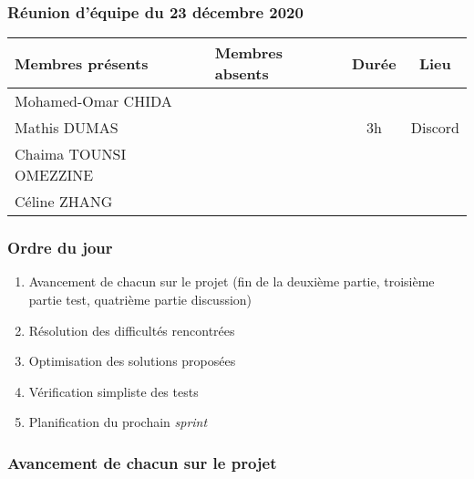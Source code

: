 


% 
\subsubsection*{\large{Réunion d'équipe du 23 décembre 2020}}
\begin{center}
\begin{tabular}{| l | l || c | c |}
    \hline
    Membres présents & Membres absents & Durée & Lieu \\
    \hline
    Mohamed-Omar CHIDA & & & \\ Mathis DUMAS & & 3h & Discord \\ Chaima TOUNSI OMEZZINE & & & \\ Céline ZHANG & & & \\
    \hline
\end{tabular}
\end{center}

\subsubsection*{Ordre du jour}
\begin{enumerate}
    \item Avancement de chacun sur le projet (fin de la deuxième partie, troisième partie test, quatrième partie discussion)
    \item Résolution des difficultés rencontrées
    \item Optimisation des solutions proposées
    \item Vérification simpliste des tests
    \item Planification du prochain \textsl{sprint}
\end{enumerate}

\subsubsection*{Avancement de chacun sur le projet}
